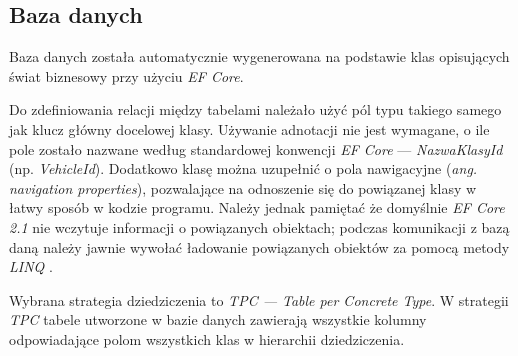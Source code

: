 \documentclass[eng,printmode,openany]{mgr}
\begin{document}
	\subsection{Baza danych}
	Baza danych została automatycznie wygenerowana na podstawie klas opisujących świat biznesowy przy użyciu \textit{EF Core}.
	
	Do zdefiniowania relacji między tabelami należało użyć pól typu takiego samego jak klucz główny docelowej klasy\cite{msdn-efcore-relationships}. Używanie adnotacji nie jest wymagane, o ile pole zostało nazwane według standardowej konwencji \textit{EF Core} — \textit{NazwaKlasyId} (np. \textit{VehicleId}). Dodatkowo klasę można uzupełnić o pola nawigacyjne (\textit{ang. navigation properties}), pozwalające na odnoszenie się do powiązanej klasy w łatwy sposób w kodzie programu. Należy jednak pamiętać że domyślnie \textit{EF Core 2.1} nie wczytuje informacji o powiązanych obiektach; podczas komunikacji z bazą daną należy jawnie wywołać ładowanie powiązanych obiektów za pomocą metody \textit{LINQ} .
	
	
	
	
	
	
	Wybrana strategia dziedziczenia to \textit{TPC — Table per Concrete Type}. W strategii \textit{TPC} tabele utworzone w bazie danych zawierają wszystkie kolumny odpowiadające polom wszystkich klas w hierarchii dziedziczenia.
	
\end{document}
